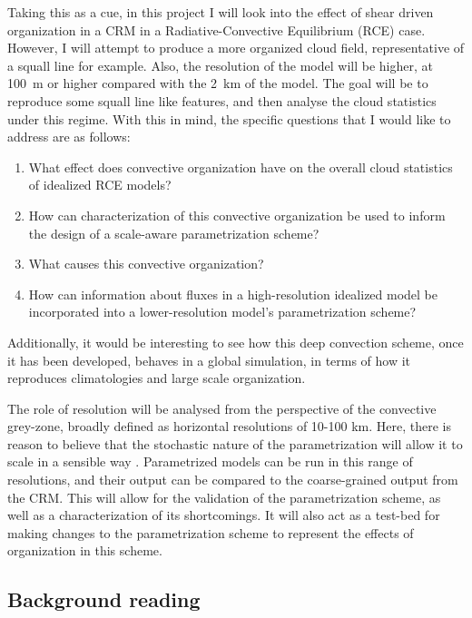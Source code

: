 \documentclass[11pt,a4paper]{article}
\begin{document}
Taking this as a cue, in this project I will look into the effect of shear driven organization in a CRM in a Radiative-Convective Equilibrium (RCE) case. However, I will attempt to produce a more organized cloud field, representative of a squall line for example. Also, the resolution of the model will be higher, at \SI{100}{m} or higher compared with the \SI{2}{km} of the \cite{cohen2006fluctuations} model. The goal will be to reproduce some squall line like features, and then analyse the cloud statistics under this regime. With this in mind, the specific questions that I would like to address are as follows:

\begin{enumerate}
    \item What effect does convective organization have on the overall cloud statistics of idealized RCE models?
    \item How can characterization of this convective organization be used to inform the design of a scale-aware parametrization scheme?
    \item What causes this convective organization?
    \item How can information about fluxes in a high-resolution idealized model be incorporated into a lower-resolution model's parametrization scheme?
\end{enumerate}

Additionally, it would be interesting to see how this deep convection scheme, once it has been developed, behaves in a global simulation, in terms of how it reproduces climatologies and large scale organization.

The role of resolution will be analysed from the perspective of the convective grey-zone, broadly defined as horizontal resolutions of 10-100 km. Here, there is reason to believe that the stochastic nature of the parametrization will allow it to scale in a sensible way \parencite{sakradzija2016stochastic}. Parametrized models can be run in this range of resolutions, and their output can be compared to the coarse-grained output from the CRM. This will allow for the validation of the parametrization scheme, as well as a characterization of its shortcomings. It will also act as a test-bed for making changes to the parametrization scheme to represent the effects of organization in this scheme. 



\subsection{Background reading}
\end{document}
